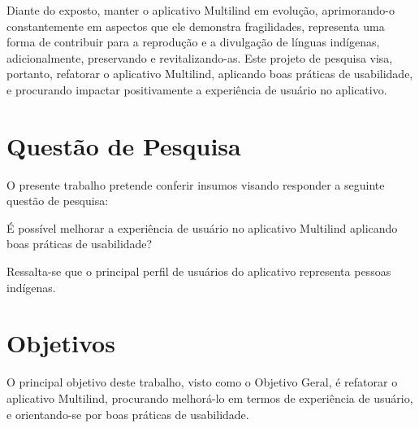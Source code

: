 Diante do exposto, manter o aplicativo Multilind em evolução, aprimorando-o constantemente em aspectos que ele demonstra fragilidades, representa uma forma de
contribuir para a reprodução e a divulgação de línguas indígenas, adicionalmente, preservando e revitalizando-as. Este projeto de pesquisa visa, portanto,
refatorar o aplicativo Multilind, aplicando boas práticas de usabilidade, e procurando impactar positivamente a experiência de usuário no aplicativo.

\section{Questão de Pesquisa}
\label{sec:QuestaodePesquisa}

O presente trabalho pretende conferir insumos visando responder a seguinte questão de pesquisa:

É  possível melhorar a experiência de usuário no aplicativo Multilind aplicando boas práticas de usabilidade? 

Ressalta-se que o principal perfil de usuários do aplicativo representa pessoas indígenas.

\section{Objetivos}
\label{sec:Objetivos}

O principal objetivo deste trabalho, visto como o Objetivo Geral, é refatorar o aplicativo Multilind, procurando melhorá-lo em termos de experiência de usuário, e
orientando-se por boas práticas de usabilidade. 

